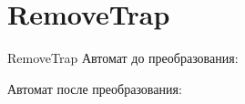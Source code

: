 \section{RemoveTrap}
\begin{frame}{RemoveTrap}
	Автомат до преобразования:


	Автомат после преобразования:


\end{frame}

